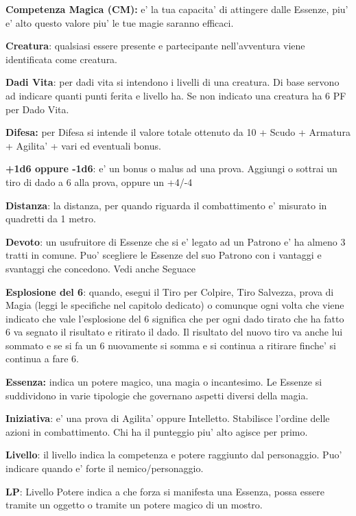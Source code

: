 \documentclass[a4paper,11pt,twoside,openany]{dndbook}
\begin{document}
\textbf{Competenza Magica (CM):} e' la tua capacita' di attingere dalle Essenze, piu' e' alto questo valore piu' le tue magie saranno efficaci.

\textbf{Creatura}: qualsiasi essere presente e partecipante nell'avventura viene identificata come creatura.

\textbf{Dadi Vita}: per dadi vita si intendono i livelli di una creatura. Di base servono ad indicare quanti punti ferita e livello ha. Se non indicato una creatura ha 6 PF per Dado Vita.

\textbf{Difesa:} per Difesa si intende il valore totale ottenuto da 10 + Scudo + Armatura + Agilita' + vari ed eventuali bonus.

\textbf{+1d6 oppure -1d6}: e' un bonus o malus ad una prova. Aggiungi o sottrai un tiro di dado a 6 alla prova, oppure un +4/-4

\textbf{Distanza}: la distanza, per quando riguarda il combattimento e' misurato in quadretti da 1 metro.

\textbf{Devoto}: un usufruitore di Essenze che si e’ legato ad un Patrono e’ ha almeno 3 tratti in comune.
Puo’ scegliere le Essenze del suo Patrono con i vantaggi e svantaggi che concedono. Vedi anche Seguace

\textbf{Esplosione del 6}: quando, esegui il Tiro per Colpire, Tiro Salvezza, prova di Magia (leggi le specifiche nel capitolo dedicato) o comunque ogni volta che viene indicato che vale l'esplosione del 6 significa che per ogni dado tirato che ha fatto 6 va segnato il risultato e ritirato il dado. Il risultato del nuovo tiro va anche lui sommato e se si fa un 6 nuovamente si somma e si continua a ritirare finche' si continua a fare 6.

\textbf{Essenza:} indica un potere magico, una magia o incantesimo. Le Essenze si suddividono in varie tipologie che governano aspetti diversi della magia.

\textbf{Iniziativa}: e' una prova di Agilita' oppure Intelletto. Stabilisce l'ordine delle azioni in combattimento. Chi ha il punteggio piu' alto agisce per primo.

\textbf{Livello}: il livello indica la competenza e potere raggiunto dal personaggio. Puo' indicare quando e' forte il nemico/personaggio. 

\textbf{LP}: Livello Potere indica a che forza si manifesta una Essenza, possa essere tramite un oggetto o tramite un potere magico di un mostro.
\end{document}
